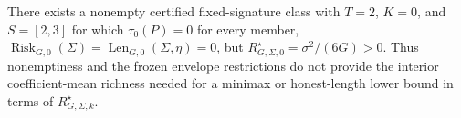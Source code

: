 There exists a nonempty certified fixed-signature class with \(T=2\), \(K=0\), and \(S=[2,3]\) for which \(\tau_0(P)=0\) for every member, \(\operatorname{Risk}_{G,0}(\Sigma)=\operatorname{Len}_{G,0}(\Sigma,\eta)=0\), but \(R_{G,\Sigma,0}^{\star}=\sigma^2/(6G)>0\). Thus nonemptiness and the frozen envelope restrictions do not provide the interior coefficient-mean richness needed for a minimax or honest-length lower bound in terms of \(R_{G,\Sigma,k}^{\star}\).